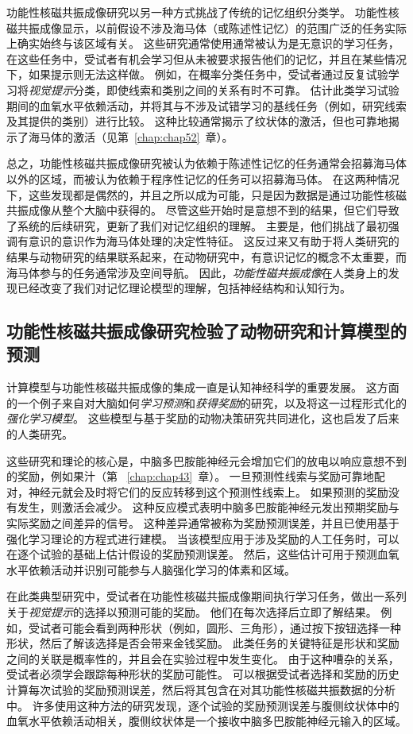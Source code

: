 功能性核磁共振成像研究以另一种方式挑战了传统的记忆组织分类学。
功能性核磁共振成像显示，以前假设不涉及海马体（或陈述性记忆）的范围广泛的任务实际上确实始终与该区域有关。
这些研究通常使用通常被认为是无意识的学习任务，在这些任务中，受试者有机会学习但从未被要求报告他们的记忆，并且在某些情况下，如果提示则无法这样做。
例如，在概率分类任务中，受试者通过反复试验学习将\textit{视觉提示}分类，即使线索和类别之间的关系有时不可靠。
估计此类学习试验期间的血氧水平依赖活动，并将其与不涉及试错学习的基线任务（例如，研究线索及其提供的类别）进行比较。
这种比较通常揭示了纹状体的激活，但也可靠地揭示了海马体的激活（见第~\ref{chap:chap52}~章）。


总之，功能性核磁共振成像研究被认为依赖于陈述性记忆的任务通常会招募海马体以外的区域，而被认为依赖于程序性记忆的任务可以招募海马体。
在这两种情况下，这些发现都是偶然的，并且之所以成为可能，只是因为数据是通过功能性核磁共振成像从整个大脑中获得的。
尽管这些开始时是意想不到的结果，但它们导致了系统的后续研究，更新了我们对记忆组织的理解。
主要是，他们挑战了最初强调有意识的意识作为海马体处理的决定性特征。
这反过来又有助于将人类研究的结果与动物研究的结果联系起来，在动物研究中，有意识记忆的概念不太重要，而海马体参与的任务通常涉及空间导航。
因此，\textit{功能性磁共振成像}在人类身上的发现已经改变了我们对记忆理论模型的理解，包括神经结构和认知行为。



\subsection{功能性核磁共振成像研究检验了动物研究和计算模型的预测}

计算模型与功能性核磁共振成像的集成一直是认知神经科学的重要发展。
这方面的一个例子来自对大脑如何\textit{学习预测}和\textit{获得奖励}的研究，以及将这一过程形式化的\textit{强化学习模型}。
这些模型与基于奖励的动物决策研究共同进化，这也启发了后来的人类研究。


这些研究和理论的核心是，中脑多巴胺能神经元会增加它们的放电以响应意想不到的奖励，例如果汁（第 ~\ref{chap:chap43}~章）。 
一旦预测性线索与奖励可靠地配对，神经元就会及时将它们的反应转移到这个预测性线索上。
如果预测的奖励没有发生，则激活会减少。
这种反应模式表明中脑多巴胺能神经元发出预期奖励与实际奖励之间差异的信号。
这种差异通常被称为奖励预测误差，并且已使用基于强化学习理论的方程式进行建模。
当该模型应用于涉及奖励的人工任务时，可以在逐个试验的基础上估计假设的奖励预测误差。
然后，这些估计可用于预测血氧水平依赖活动并识别可能参与人脑强化学习的体素和区域。


在此类典型研究中，受试者在功能性核磁共振成像期间执行学习任务，做出一系列关于\textit{视觉提示}的选择以预测可能的奖励。
他们在每次选择后立即了解结果。
例如，受试者可能会看到两种形状（例如，圆形、三角形），通过按下按钮选择一种形状，然后了解该选择是否会带来金钱奖励。
此类任务的关键特征是形状和奖励之间的关联是概率性的，并且会在实验过程中发生变化。
由于这种嘈杂的关系，受试者必须学会跟踪每种形状的奖励可能性。
可以根据受试者选择和奖励的历史计算每次试验的奖励预测误差，然后将其包含在对其功能性核磁共振数据的分析中。
许多使用这种方法的研究发现，逐个试验的奖励预测误差与腹侧纹状体中的血氧水平依赖活动相关，腹侧纹状体是一个接收中脑多巴胺能神经元输入的区域。


